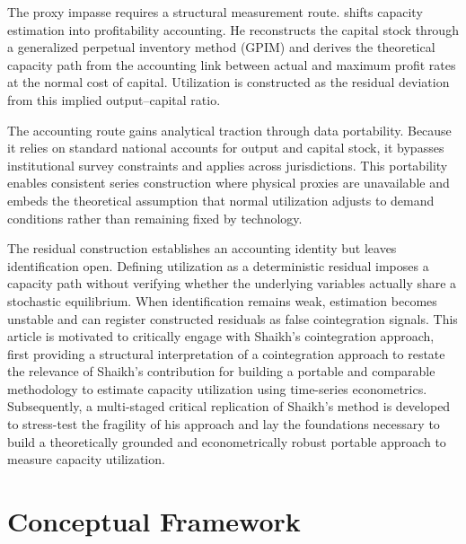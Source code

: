 \documentclass[11pt]{article}
\begin{document}
The proxy impasse requires a structural measurement route. \citep{Shaikh2016} shifts capacity estimation into profitability accounting. He reconstructs the capital stock through a generalized perpetual inventory method (GPIM) and derives the theoretical capacity path from the accounting link between actual and maximum profit rates at the normal cost of capital. Utilization is constructed as the residual deviation from this implied output–capital ratio.

The accounting route gains analytical traction through data portability. Because it relies on standard national accounts for output and capital stock, it bypasses institutional survey constraints and applies across jurisdictions. This portability enables consistent series construction where physical proxies are unavailable and embeds the theoretical assumption that normal utilization adjusts to demand conditions rather than remaining fixed by technology.

The residual construction establishes an accounting identity but leaves identification open. Defining utilization as a deterministic residual imposes a capacity path without verifying whether the underlying variables actually share a stochastic equilibrium. When identification remains weak, estimation becomes unstable and can register constructed residuals as false cointegration signals. This article is motivated to critically engage with Shaikh’s cointegration approach, first providing a structural interpretation of a cointegration approach to restate the relevance of Shaikh’s contribution for building a portable and comparable methodology to estimate capacity utilization using time-series econometrics. Subsequently, a multi-staged critical replication of Shaikh’s method is developed to stress-test the fragility of his approach and lay the foundations necessary to build a theoretically grounded and econometrically robust portable approach to measure capacity utilization.

\section{Conceptual Framework}
\label{sec:conceptual_framework}
\end{document}

